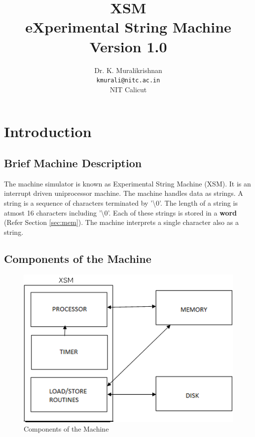 \documentclass[11pt]{report}
\title{XSM \\ eXperimental String Machine \\
Version 1.0}
\author{Dr. K. Muralikrishnan  \\ \texttt{kmurali@nitc.ac.in} \\ {NIT Calicut} }
\begin{document}
\maketitle
\pagebreak

\thispagestyle{plain}

\tableofcontents
\pagebreak


\chapter{Introduction}

\section{Brief Machine Description}
The machine simulator is known as Experimental String Machine (XSM). It is an interrupt driven uniprocessor machine. The machine handles data as strings. A string is a sequence of characters terminated by '\textbackslash 0'. The length of a string is atmost 16 characters including '\textbackslash 0'. Each of these strings is stored in a \textbf{word}  (Refer Section \ref{sec:mem}). The machine interprets a single character also as a string.

\section{Components of the Machine}

\begin{figure}[hbtp]
\begin{center}
\includegraphics[scale=0.5]{block.png}
\end{center}
\caption{Components of the Machine}
\end{figure}
\end{document}
